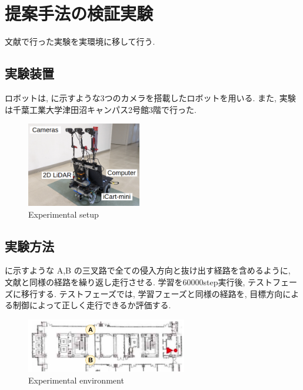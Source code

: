 \documentclass{jarticle}
\begin{document}

\section{提案手法の検証実験}
文献\cite{mech}で行った実験を実環境に移して行う.
\subsection{実験装置}
ロボットは, に示すような3つのカメラを搭載したロボットを用いる. また, 実験は千葉工業大学津田沼キャンパス2号館3階で行った.

\begin{figure}[h]
  \centering
   \includegraphics[width=50mm]{gamma3.png}
   \vspace*{-4mm}
   \caption{Experimental setup}
   \label{fig: fig6}
 \end{figure}

 \subsection{実験方法}
 に示すような A,B の三叉路で全ての侵入方向と抜け出す経路を含めるように, 文献\cite{mech}と同様の経路を繰り返し走行させる. 学習を60000step実行後, テストフェーズに移行する. テストフェーズでは, 学習フェーズと同様の経路を, 目標方向による制御によって正しく走行できるか評価する.

 \begin{figure}[h]
  \centering
   \includegraphics[width=70mm]{tsudanuma2.png}
   \vspace*{-4mm}
   \caption{Experimental environment}
   \label{fig: fig7}
 \end{figure}
\end{document}

